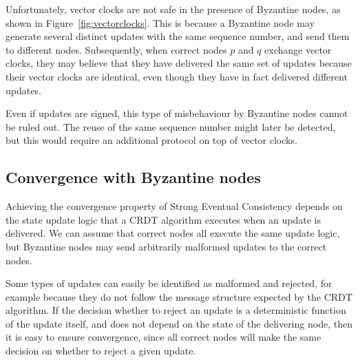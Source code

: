 \documentclass[sigplan,review]{acmart}
\begin{document}
Unfortunately, vector clocks are not safe in the presence of Byzantine nodes, as shown in Figure~\ref{fig:vectorclocks}.
This is because a Byzantine node may generate several distinct updates with the same sequence number, and send them to different nodes.
Subsequently, when correct nodes $p$ and $q$ exchange vector clocks, they may believe that they have delivered the same set of updates because their vector clocks are identical, even though they have in fact delivered different updates.

Even if updates are signed, this type of misbehaviour by Byzantine nodes cannot be ruled out.
The reuse of the same sequence number might later be detected, but this would require an additional protocol on top of vector clocks.

\subsection{Convergence with Byzantine nodes}\label{sec:convergence}

Achieving the convergence property of Strong Eventual Consistency depends on the state update logic that a CRDT algorithm executes when an update is delivered.
We can assume that correct nodes all execute the same update logic, but Byzantine nodes may send arbitrarily malformed updates to the correct nodes.

Some types of updates can easily be identified as malformed and rejected, for example because they do not follow the message structure expected by the CRDT algorithm.
If the decision whether to reject an update is a deterministic function of the update itself, and does not depend on the state of the delivering node, then it is easy to ensure convergence, since all correct nodes will make the same decision on whether to reject a given update.
\end{document}

